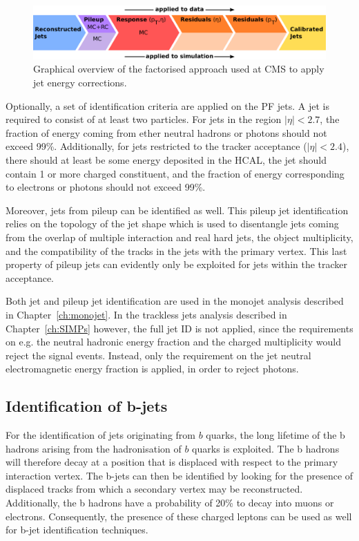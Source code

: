 \begin{figure}[ht]
  \centering
 \includegraphics[width=.85\textwidth]{JEC.pdf} 
 \caption{Graphical overview of the factorised approach used at \ac{CMS} to apply jet energy corrections.}
 \label{fig:JEC}
\end{figure}

Optionally, a set of identification criteria are applied on the \ac{PF} jets. A jet is required to consist of at least two particles. For jets in the region $|\eta| < 2.7$, the fraction of energy coming from ether neutral hadrons or photons should not exceed 99\%. Additionally, for jets restricted to the tracker acceptance ($|\eta| < 2.4$), there should at least be some energy deposited in the \ac{HCAL}, the jet should contain 1 or more charged constituent, and the fraction of energy corresponding to electrons or photons should not exceed 99\%. 

Moreover, jets from pileup can be identified as well. This pileup jet identification relies on the topology of the jet shape which is used to disentangle jets coming from the overlap of multiple interaction and real hard jets, the object multiplicity, and the compatibility of the tracks in the jets with the primary vertex. This last property of pileup jets can evidently only be exploited for jets within the tracker acceptance.

Both jet and pileup jet identification are used in the monojet analysis described in Chapter~\ref{ch:monojet}. In the trackless jets analysis described in Chapter~\ref{ch:SIMPs} however, the full jet ID is not applied, since the requirements on e.g. the neutral hadronic energy fraction and the charged multiplicity would reject the signal events. Instead, only the requirement on the jet neutral electromagnetic energy fraction is applied, in order to reject photons.

\subsection{Identification of b-jets}
\label{sec:btagging}

For the identification of jets originating from $b$ quarks, the long lifetime of the b hadrons arising from the hadronisation of $b$ quarks is exploited. The b hadrons will therefore decay at a position that is displaced with respect to the primary interaction vertex. The b-jets can then be identified by looking for the presence of displaced tracks from which a secondary vertex may be reconstructed. Additionally, the b hadrons have a probability of 20\% to decay into muons or electrons. Consequently, the presence of these charged leptons can be used as well for b-jet identification techniques.

